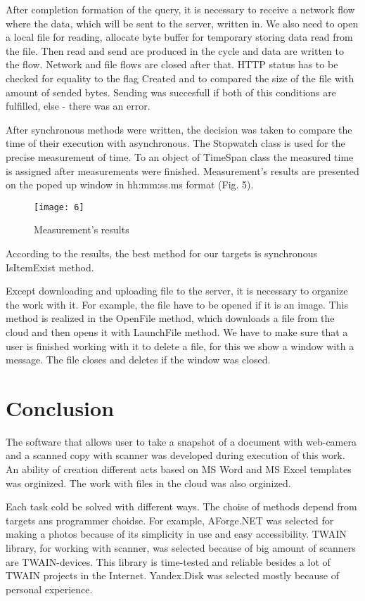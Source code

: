 \documentclass[12pt,journal,compsoc]{D:/Магистратура/English/bare_conf/IEEEtran}
\begin{document}
After completion formation of the query, it is necessary to receive a network flow where the data, which will be sent to the server, written in. We also need to open a local file for reading, allocate byte buffer for temporary storing data read from the file. Then read and send are produced in the cycle and data are written to the flow. Network and file flows are closed after that. HTTP status has to be checked for equality to the flag Created and to compared the size of the file with amount of sended bytes. Sending was succesfull if both of this conditions are fulfilled, else - there was an error.

After synchronous methods were written, the decision was taken to compare the time of their execution with asynchronous. The Stopwatch class is used for the precise measurement of time. To an object of TimeSpan class the measured time is assigned after measurements were finished. Measurement's results are presented on the poped up window in hh:mm:ss.ms format (Fig. 5).
\begin{figure}[h]
\centering
\texttt{[image: 6]}
\centering
\caption{Measurement's results}
\end{figure}

According to the results, the best method for our targets is synchronous IsItemExist method.

Except downloading and uploading file to the server, it is necessary to organize the work with it. For example, the file have to be opened if it is an image. This method is realized in the OpenFile method, which downloads a file from the cloud and then opens it with LaunchFile method. We have to make sure that a user is finished working with it to delete a file, for this we show a window with a message. The file closes and deletes if the window was closed.

\section{Conclusion}
The software that allows user to take a snapshot of a document with web-camera and a scanned copy with scanner was developed during execution of this work. An ability of creation different acts based on MS Word and MS Excel templates was orginized. The work with files in the cloud was also orginized.

Each task cold be solved with different ways. The choise of methods depend from targets ans programmer choidse. For example, AForge.NET was selected for making a photos because of its simplicity in use and easy accessibility. TWAIN library, for working with scanner, was selected because of big amount of scanners are TWAIN-devices. This library is time-tested and reliable besides a lot of TWAIN projects in the Internet. Yandex.Disk was selected mostly because of personal experience.
\end{document}
